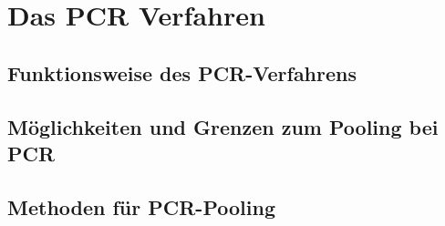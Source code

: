 \chapter{Das PCR Verfahren}

\section{Funktionsweise des PCR-Verfahrens}


\section{Möglichkeiten und Grenzen zum Pooling bei PCR}


\section{Methoden für PCR-Pooling}
